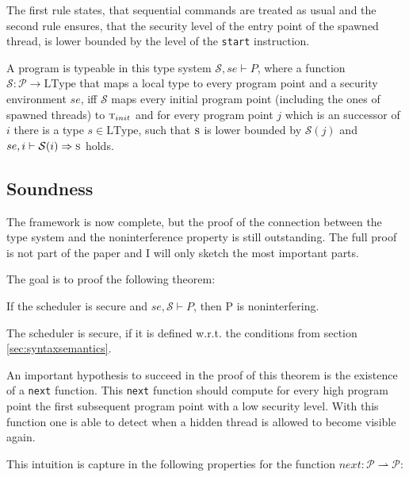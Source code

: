 \documentclass[a4paper,10pt]{llncs}
\begin{document}
The first rule states, that sequential commands are treated as usual
and the second rule ensures, that the security level of the entry point
of the spawned thread, is lower bounded by the level of the \texttt{start}
instruction.

A program is typeable in this type system $\mathcal{S}, se \vdash P$, where a function $\mathcal{S}:
\mathcal{P} \rightarrow \text{LType}$ that maps a local type to every program point
and a security environment $se$, iff $\mathcal{S}$ maps every initial program point
(including the ones of spawned threads) to $\textsc{t}_{init}$ and for every program point $j$ which is an
successor of $i$ there is a type $s \in \text{LType}$, such that $\textsc{s}$ is lower bounded
by $\mathcal{S}(j)$ and $se, i \vdash \mathcal{S}(i) \Rightarrow \textsc{s}$ holds.


\subsection{Soundness}
\label{sec:soundness}
The framework is now complete, but the proof of the connection between the
type system and the noninterference property is still outstanding. The full
proof is not part of the paper and I will only sketch the most important
parts.

The goal is to proof the following theorem:

\begin{theorem}
If the scheduler is secure and $se, \mathcal{S} \vdash P$, then P is noninterfering.
\end{theorem}

The scheduler is secure, if it is defined w.r.t. the conditions from section \ref{sec:syntaxsemantics}.

An important hypothesis to succeed in the proof of this theorem is the existence
of a \texttt{next} function. This \texttt{next} function should compute for every
high program point the first subsequent program point with a low security level. With
this function one is able to detect when a hidden thread is allowed to become visible
again.

This intuition is capture in the following properties for the function $next: \mathcal{P}
\rightharpoonup \mathcal{P}$:
\end{document}
